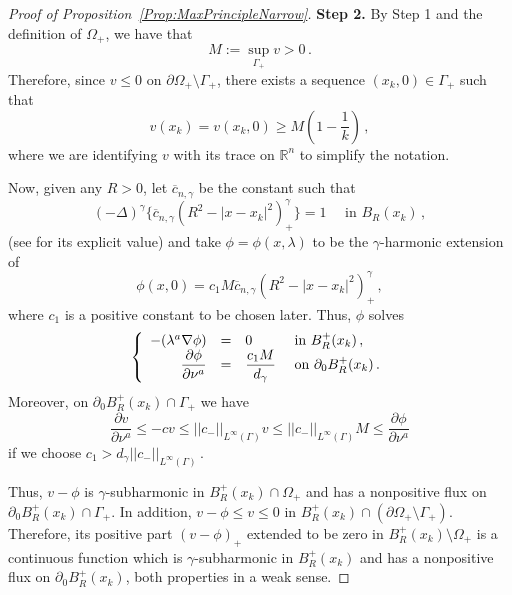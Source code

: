 \documentclass[12pt,reqno]{amsart}
\theoremstyle{definition}
\theoremstyle{remark}
\newcommand{\con}[1]{\mathbb{#1}}
\newcommand{\R}{\con{R}} %
\newcommand{\norm}[1]{\left | \left |{#1} \right | \right |}
\newcommand{\s}{\gamma}
\newcommand{\fraclaplacian}{(-\Delta)^\s}
\newcommand{\bpar}[1]{\left ( {#1}\right )}
\newcommand\beqc[1]{\left\{\begin{array}{#1}}
\newcommand\eeqc{\end{array} \right.}
\def\PDEsystem{rcll}
\let\div\relax
\DeclareMathOperator{\div}{div}
\numberwithin{equation}{section}
\begin{document}
\begin{proof}[Proof of Proposition~\ref{Prop:MaxPrincipleNarrow}]
	\textbf{Step 2.} By Step 1 and the definition of $\Omega_+$, we have that
	\begin{equation}
	\label{Eq:PositiveSup}
	M := \sup_{\Gamma_+} v > 0\,.
	\end{equation}
	Therefore, since $v\leq 0$ on $\partial \Omega_+\setminus \Gamma_+$, there exists a sequence $(x_k,0)\in \Gamma_+$ such that
	$$
	v(x_k) = v(x_k,0) \geq M \bpar{1- \dfrac{1}{k}}\,,
	$$
	where we are identifying $v$ with its trace on $\R^n$ to simplify the notation. 
	
	Now, given any $R>0$, let $\overline{c}_{n,\s}$ be the constant such that
	$$
	\fraclaplacian \{ \overline{c}_{n,\s} (R^2 - |x-x_k|^2)^\s_+ \} = 1 \quad \text{ in } B_R (x_k)\,,
	$$
	(see \cite{BogdanEtAl} for its explicit value) and take $\phi = \phi(x,\lambda)$ to be the $\s$-harmonic extension of 
	$$
	\phi(x,0) = c_1 M  \overline{c}_{n,\s}  (R^2 - |x-x_k|^2)^\s_+\,,
	$$
	where $c_1$ is a positive constant to be chosen later. Thus, $\phi$ solves
	$$
	\beqc{\PDEsystem}
	-\div(\lambda^a \nabla \phi) &=& 0 & \text{ in } B^+_R(x_k)\,, \\
	\dfrac{\partial \phi}{\partial \nu^a} & = & \dfrac{c_1 M}{d_\s} & \text{ on } \partial_0 B^+_R(x_k)\,.
	\eeqc
	$$
	Moreover, on $\partial_0 B^+_R(x_k) \cap \Gamma_+$ we have
	$$
	\dfrac{\partial v}{\partial \nu^a} \leq - c v  \leq \norm{c_-}_{L^\infty (\Gamma)} v \leq  \norm{c_-}_{L^\infty (\Gamma)} M \leq \dfrac{\partial \phi}{\partial \nu^a}
	$$
	if we choose $c_1 > d_\s\norm{c_-}_{L^\infty (\Gamma)}$\,.
	
	Thus, $v-\phi$ is $\s$-subharmonic in $B^+_R(x_k) \cap  \Omega_+$ and has a nonpositive flux on $\partial_0 B^+_R(x_k) \cap \Gamma_+$. In addition, $v-\phi \leq v \leq 0$ in $B_R^+(x_k)\cap (\partial  \Omega_+ \setminus \Gamma_+)$. Therefore, its positive part $(v-\phi)_+$ extended to be zero in $B_R^+(x_k)\setminus  \Omega_+ $ is a continuous function which is $\s$-subharmonic in $B^+_R(x_k)$ and has a nonpositive flux on $\partial_0 B^+_R(x_k)$, both properties in a weak sense.
	

\end{proof}
\end{document}
